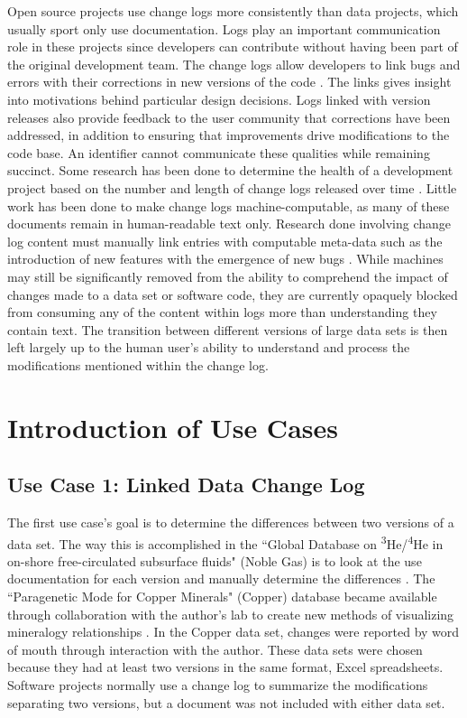 Open source projects use change logs more consistently than data projects, which usually sport only use documentation.
Logs play an important communication role in these projects since developers can contribute without having been part of the original development team.
The change logs allow developers to link bugs and errors with their corrections in new versions of the code \cite{Chen:2004:OCL:990374.990391}.
The links gives insight into motivations behind particular design decisions.
Logs linked with version releases also provide feedback to the user community that corrections have been addressed, in addition to ensuring that improvements drive modifications to the code base.
An identifier cannot communicate these qualities while remaining succinct.
Some research has been done to determine the health of a development project based on the number and length of change logs released over time \cite{German03automatingthe}.
Little work has been done to make change logs machine-computable, as many of these documents remain in human-readable text only.
Research done involving change log content must manually link entries with computable meta-data such as the introduction of new features with the emergence of new bugs \cite{6132954}.
While machines may still be significantly removed from the ability to comprehend the impact of changes made to a data set or software code, they are currently opaquely blocked from consuming any of the content within logs more than understanding they contain text.
The transition between different versions of large data sets is then left largely up to the human user's ability to understand and process the modifications mentioned within the change log.

\section{Introduction of Use Cases}

\subsection{Use Case 1: Linked Data Change Log}

The first use case's goal is to determine the differences between two versions of a data set.
The way this is accomplished in the ``Global Database on \textsuperscript{3}He/\textsuperscript{4}He in on-shore free-circulated subsurface fluids" (Noble Gas) is to look at the use documentation for each version and manually determine the differences \cite{Polyak2015}.
The ``Paragenetic Mode for Copper Minerals" (Copper) database became available through collaboration with the author's lab to create new methods of visualizing mineralogy relationships \cite{Morrison2016}.
In the Copper data set, changes were reported by word of mouth through interaction with the author.
These data sets were chosen because they had at least two versions in the same format, Excel spreadsheets.
Software projects normally use a change log to summarize the modifications separating two versions, but a document was not included with either data set.

